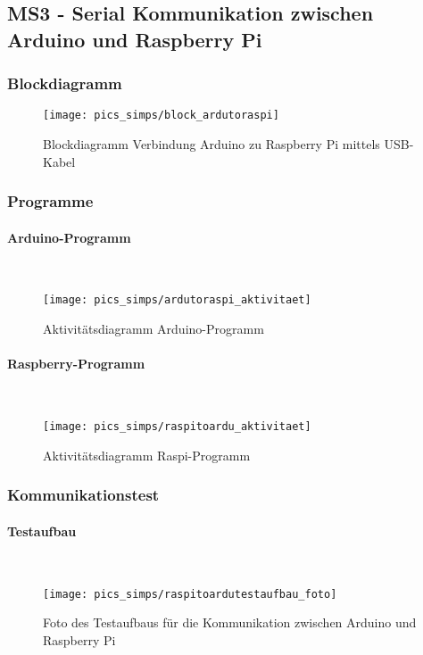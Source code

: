 \documentclass[12pt,a4paper]{article}
\begin{document}
\subsection{MS3 - Serial Kommunikation zwischen Arduino und Raspberry Pi}
\subsubsection{Blockdiagramm}
\begin{figure}[h!]
	\centering
	\texttt{[image: pics\_simps/block\_ardutoraspi]}
	\caption{Blockdiagramm Verbindung Arduino zu Raspberry Pi mittels USB-Kabel}
\end{figure}
%
\subsubsection{Programme}
\paragraph{Arduino-Programm}\mbox{}\\
\begin{figure}[h!]
	\centering
	\texttt{[image: pics\_simps/ardutoraspi\_aktivitaet]}
	\caption{Aktivitätsdiagramm Arduino-Programm}
\end{figure}
%
%
\newpage
\paragraph{Raspberry-Programm}\mbox{}\\
\begin{figure}[h!]
	\centering
	\texttt{[image: pics\_simps/raspitoardu\_aktivitaet]}
	\caption{Aktivitätsdiagramm Raspi-Programm}
\end{figure}
%
%
\newpage
\subsubsection{Kommunikationstest}
\paragraph{Testaufbau}\mbox{}\\
\begin{figure}[h!]
	\centering
	\texttt{[image: pics\_simps/raspitoardutestaufbau\_foto]}
	\caption{Foto des Testaufbaus für die Kommunikation zwischen Arduino und Raspberry Pi}
\end{figure}
%
%
\newpage
\end{document}
